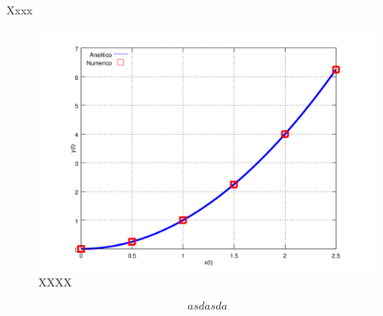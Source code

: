 Xxxx


\begin{figure}[h!]
\caption{XXXX}
\label{fig:comp}
\includegraphics[width=\textwidth]{imagenes/chap4/x_vs_y}
\end{figure}

\begin{equation}
asdasda
\end{equation}
